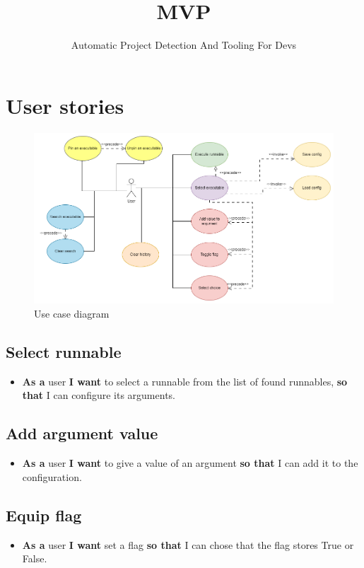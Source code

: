 \documentclass{article}
\title{MVP}
\author{Automatic Project Detection And Tooling For Devs}
\date{}
\begin{document}
\maketitle

\section{User stories}

\begin{figure}[h]
    \centering
    \includegraphics[width=1\linewidth]{img/use_case_diagram.drawio.png}
    \caption{Use case diagram}
    \label{fig:enter-label}
\end{figure}

\subsection{Select runnable}
\begin{itemize}
    \item \textbf{As a} user \textbf{I want} to select a runnable from the list of found runnables, \textbf{so that} I can configure its arguments.
\end{itemize}

\subsection{Add argument value}
\begin{itemize}
    \item \textbf{As a} user \textbf{I want} to give a value of an argument \textbf{so that} I can add it to the configuration.
\end{itemize}

\subsection{Equip flag}
\begin{itemize}
    \item \textbf{As a} user \textbf{I want} set a flag \textbf{so that} I can chose that the flag stores True or False.
\end{itemize}
\end{document}
